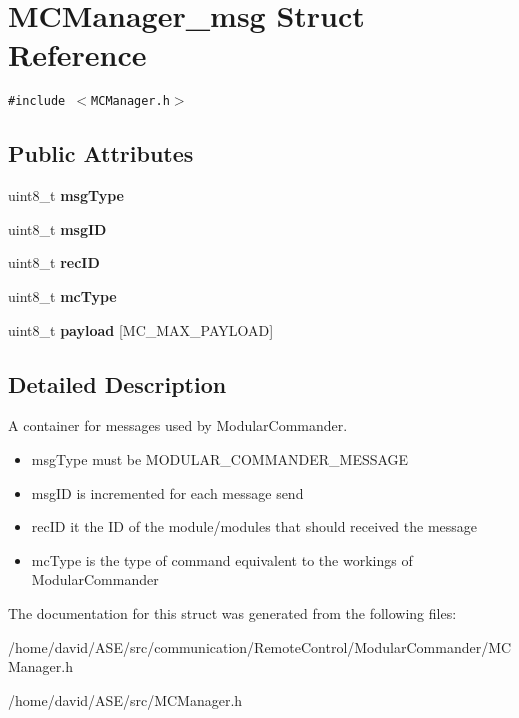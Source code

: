 \hypertarget{structMCManager__msg}{
\section{MCManager\_\-msg Struct Reference}
\label{structMCManager__msg}
}
{\tt \#include $<$MCManager.h$>$}

\subsection*{Public Attributes}
\begin{CompactItemize}
\item 
\hypertarget{structMCManager__msg_793f1df791cd797089add8db19ec237c}{
uint8\_\-t \textbf{msgType}}
\label{structMCManager__msg_793f1df791cd797089add8db19ec237c}

\item 
\hypertarget{structMCManager__msg_e96601b2f5c796f078fc75d40f6f3252}{
uint8\_\-t \textbf{msgID}}
\label{structMCManager__msg_e96601b2f5c796f078fc75d40f6f3252}

\item 
\hypertarget{structMCManager__msg_7f5ea83d351a0b7beb5ac1e132895ceb}{
uint8\_\-t \textbf{recID}}
\label{structMCManager__msg_7f5ea83d351a0b7beb5ac1e132895ceb}

\item 
\hypertarget{structMCManager__msg_7675796d23b723400a16d069a9781194}{
uint8\_\-t \textbf{mcType}}
\label{structMCManager__msg_7675796d23b723400a16d069a9781194}

\item 
\hypertarget{structMCManager__msg_d99c205d4882be2173b2e68c74a2f4a5}{
uint8\_\-t \textbf{payload} \mbox{[}MC\_\-MAX\_\-PAYLOAD\mbox{]}}
\label{structMCManager__msg_d99c205d4882be2173b2e68c74a2f4a5}

\end{CompactItemize}


\subsection{Detailed Description}
A container for messages used by ModularCommander.\begin{itemize}
\item msgType must be MODULAR\_\-COMMANDER\_\-MESSAGE\item msgID is incremented for each message send\item recID it the ID of the module/modules that should received the message\item mcType is the type of command equivalent to the workings of ModularCommander \end{itemize}


The documentation for this struct was generated from the following files:\begin{CompactItemize}
\item 
/home/david/ASE/src/communication/RemoteControl/ModularCommander/MCManager.h\item 
/home/david/ASE/src/MCManager.h\end{CompactItemize}
